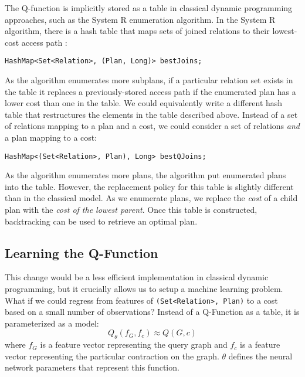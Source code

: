 The Q-function is implicitly stored as a table in classical dynamic programming approaches, such as the System R enumeration algorithm. In the System R algorithm, there is a hash table that maps sets of joined relations to their lowest-cost access path :
\begin{lstlisting}
HashMap<Set<Relation>, (Plan, Long)> bestJoins;
\end{lstlisting}
As the algorithm enumerates more subplans, if a particular relation set exists in the table it replaces a previously-stored access path if the enumerated plan has a lower cost than one in the table. We could equivalently write a different hash table that restructures the elements in the table described above. Instead of a set of relations mapping to a plan and a cost, we could consider a set of relations \emph{and} a plan mapping to a cost: 
\begin{lstlisting}
HashMap<(Set<Relation>, Plan), Long> bestQJoins;
\end{lstlisting}

As the algorithm enumerates more plans, the algorithm put enumerated plans into the table. However, the replacement policy for this table is slightly different than in the classical model. As we enumerate plans, we replace the \emph{cost} of a child plan with the \emph{cost of the lowest parent}. Once this table is constructed, backtracking can be used to retrieve an optimal plan. 

\subsection{Learning the Q-Function}
This change  would be a less efficient implementation in classical dynamic programming, but it crucially allows us to setup a machine learning problem. 
What if we could regress from features of \texttt{(Set<Relation>, Plan)} to a cost based on a small number of observations?
Instead of a Q-Function as a table, it is parameterized as a model:
\[
Q_\theta(f_G,f_c) \approx Q(G,c)
\]
where $f_G$ is a feature vector representing the query graph and $f_c$ is a feature vector representing the particular contraction on the graph. $\theta$ defines the neural network  parameters that represent this function. 

